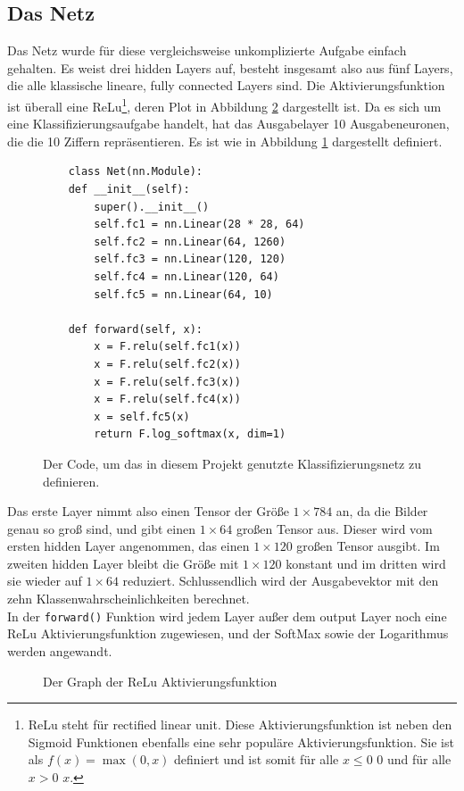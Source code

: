 \documentclass[11pt]{article}
\begin{document}
\subsection{Das Netz}\label{sec:das-netz}
Das Netz wurde für diese vergleichsweise unkomplizierte Aufgabe einfach gehalten. Es weist drei hidden Layers auf, besteht insgesamt also aus fünf Layers, die alle klassische lineare, fully connected Layers sind. Die Aktivierungsfunktion ist überall eine ReLu\footnote{ReLu steht für rectified linear unit. Diese Aktivierungsfunktion ist neben den Sigmoid Funktionen ebenfalls eine sehr populäre Aktivierungsfunktion. Sie ist als $f(x)=\max(0,x)$ definiert und ist somit für alle $x\le0$ $0$ und für alle $x>0$ $x$.}, deren Plot in Abbildung \ref{ReLu} dargestellt ist. Da es sich um eine Klassifizierungsaufgabe handelt, hat das Ausgabelayer 10 Ausgabeneuronen, die die 10 Ziffern repräsentieren. Es ist wie in Abbildung \ref{net} dargestellt definiert.
\begin{figure}[h]
 	\begin{verbatim}
	class Net(nn.Module):
	def __init__(self):
		super().__init__()
		self.fc1 = nn.Linear(28 * 28, 64)
		self.fc2 = nn.Linear(64, 1260)
		self.fc3 = nn.Linear(120, 120)
		self.fc4 = nn.Linear(120, 64)
		self.fc5 = nn.Linear(64, 10)
	
	def forward(self, x):
		x = F.relu(self.fc1(x))
		x = F.relu(self.fc2(x))
		x = F.relu(self.fc3(x))
		x = F.relu(self.fc4(x))
		x = self.fc5(x)
		return F.log_softmax(x, dim=1)
	\end{verbatim}
	\caption{Der Code, um das in diesem Projekt genutzte Klassifizierungsnetz zu definieren.}
	 \label{net}
\end{figure}
Das erste Layer nimmt also einen Tensor der Größe $1\times 784$ an, da die Bilder genau so groß sind, und gibt einen $1\times 64$ großen Tensor aus. Dieser wird vom ersten hidden Layer angenommen, das einen $1\times 120$ großen Tensor ausgibt. Im zweiten hidden Layer bleibt die Größe mit $1\times 120$ konstant und im dritten wird sie wieder auf $1\times 64$ reduziert. Schlussendlich wird der Ausgabevektor mit den zehn Klassenwahrscheinlichkeiten berechnet.\\
In der \texttt{forward()} Funktion wird jedem Layer außer dem output Layer noch eine ReLu Aktivierungsfunktion zugewiesen, und der SoftMax sowie der Logarithmus werden angewandt.
\begin{figure}[h]
	\begin{center}
	\end{center}
	\caption{Der Graph der ReLu Aktivierungsfunktion}
	\label{ReLu}
\end{figure}
\end{document}

